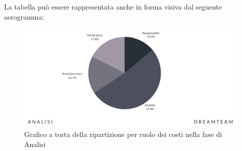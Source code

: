 La tabella può essere rappresentata anche in forma visiva dal seguente aerogramma:
\begin{figure}[!h]
\centering
\includegraphics[scale=0.65]{Sezioni/SezioniPreventivo/grafici/Analisi_costi.png}
\caption{Grafico a torta della ripartizione per ruolo dei costi nella fase di Analisi}
\end{figure}



